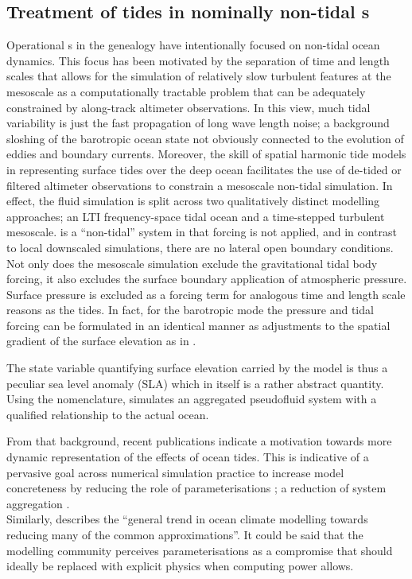 \subsection{Treatment of tides in nominally non-tidal \OGCM{}s}
\label{sec:tides_ogcm}
Operational \OGCM{}s in the \GODAE{} genealogy have intentionally focused on non-tidal ocean dynamics. This focus has been motivated by the separation of time and length scales that allows for the simulation of relatively slow turbulent features at the mesoscale as a computationally tractable problem that can be adequately constrained by along-track altimeter observations.
In this view, much tidal variability is just the fast propagation of long wave length noise; a background sloshing of the barotropic ocean state not obviously connected to the evolution of eddies and boundary currents.
Moreover, the skill of spatial harmonic tide models in representing surface tides over the deep ocean facilitates the use of de-tided or filtered altimeter observations to constrain a mesoscale non-tidal simulation. In effect, the fluid simulation is split across two qualitatively distinct modelling approaches; an LTI frequency-space tidal ocean and a time-stepped turbulent mesoscale.  
\BL{} is a ``non-tidal'' system in that \ATGP{} forcing is not applied, and in contrast to local downscaled simulations, there are no lateral open boundary conditions. Not only does the mesoscale simulation exclude the gravitational tidal body forcing, it also excludes the surface boundary application of atmospheric pressure.   
Surface pressure is excluded as a forcing term for analogous time and length scale reasons as the tides.  In fact, for the barotropic mode the pressure and tidal forcing can be formulated in an identical manner as adjustments to the spatial gradient of the surface elevation as in \citet[equation 9.9.5]{gill1982atmosphere}.

The state variable quantifying surface elevation carried by the model is thus a peculiar sea level anomaly (SLA) which in itself is a rather abstract quantity. 
Using the \citet{Stevens:2001kb} nomenclature, \BL{} simulates an aggregated pseudofluid system with a qualified relationship to the actual ocean.


From that background, recent publications indicate a motivation towards more dynamic representation of the effects of ocean tides.   This is indicative of a pervasive goal across numerical simulation practice to increase model concreteness by reducing the role of parameterisations \citep[section 5.3]{Petersen:2012tr}; a reduction of system aggregation \citep{Stevens:2001kb}.\\
Similarly, \citet[pp20]{Griffies:2004vs} describes the ``general trend in ocean climate modelling towards reducing many of the common approximations''.   It could be said that the modelling community perceives parameterisations as a compromise that should ideally be replaced with explicit physics when computing power allows.

